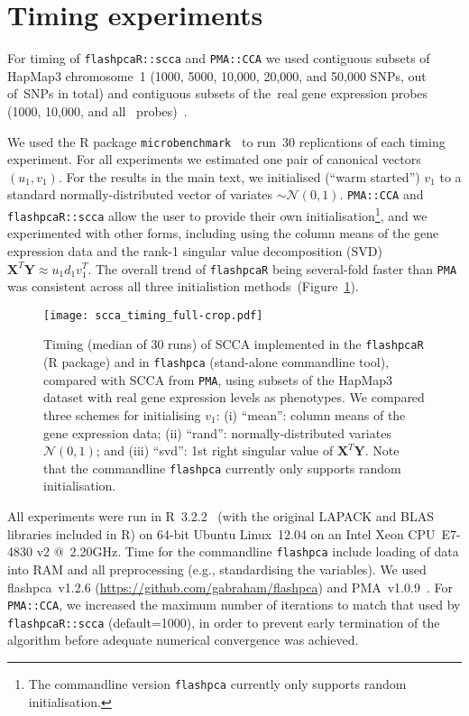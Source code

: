 \documentclass[a4paper,10pt]{scrartcl}
\begin{document}
\section{Timing experiments}

For timing of \texttt{flashpcaR::scca} and \texttt{PMA::CCA} we used
contiguous subsets of HapMap3 chromosome~1 (1000, 5000, 10,000, 20,000,
and 50,000 SNPs, out of~\nsnpschr SNPs in total) and contiguous subsets
of the~\ngenes real gene expression probes (1000, 10,000, and all~\ngenes
probes)~\citep{Stranger2012}.

We used the \textsf{R} package \texttt{microbenchmark}~\citep{Mersmann2015}
to run~30 replications of each timing experiment.  For all
experiments we estimated one pair of canonical vectors $(u_1,
v_1)$.  For the results in the main text, we initialised (``warm
started'') $v_1$ to a standard normally-distributed vector of variates
$\sim\mathcal{N}(0,1)$. \texttt{PMA::CCA} and \texttt{flashpcaR::scca}
allow the user to provide their own initialisation\footnote{The commandline
version \texttt{flashpca} currently only supports random initialisation.},
and we experimented with other forms, including using the column means
of the gene expression data and the rank-1 singular value decomposition
(SVD) $\mathbf{X}^T \mathbf{Y} \approx u_1 d_1 v_1^T$. The overall trend of
\texttt{flashpcaR} being several-fold faster than \texttt{PMA} was consistent
across all three initialistion methods~(Figure~\ref{fig:s01}).

\begin{figure}[!tpb]
\centering
\texttt{[image: scca\_timing\_full-crop.pdf]}
\caption{
Timing (median of 30 runs) of SCCA implemented in the \texttt{flashpcaR}
(\textsf{R} package) and in \texttt{flashpca} (stand-alone commandline tool),
compared with SCCA from \texttt{PMA}, using subsets of the HapMap3 dataset with real
gene expression levels as phenotypes. We compared three schemes for initialising
$v_1$: (i) ``mean'': column means of the gene expression data; (ii) ``rand'':
normally-distributed variates $\mathcal{N}(0, 1)$; and (iii) ``svd'': 1st
right singular value of $\mathbf{X}^T \mathbf{Y}$. Note that the commandline
\texttt{flashpca} currently only supports random initialisation.
}
\label{fig:s01}
\end{figure}

All experiments were run in \textsf{R}~3.2.2~\citep{R} (with the original
LAPACK and BLAS libraries included in \textsf{R}) on 64-bit Ubuntu
Linux~12.04 on an Intel Xeon CPU~E7-4830 v2 @~2.20GHz. Time for the
commandline \texttt{flashpca} include loading of data into RAM and all
preprocessing (e.g., standardising the variables). We used flashpca~v1.2.6
(\url{https://github.com/gabraham/flashpca}) and PMA~v1.0.9~\citep{Witten2013}.
For \texttt{PMA::CCA}, we increased the maximum number of iterations to match
that used by \texttt{flashpcaR::scca} (default=1000), in order to prevent
early termination of the algorithm before adequate numerical convergence
was achieved.
\end{document}
